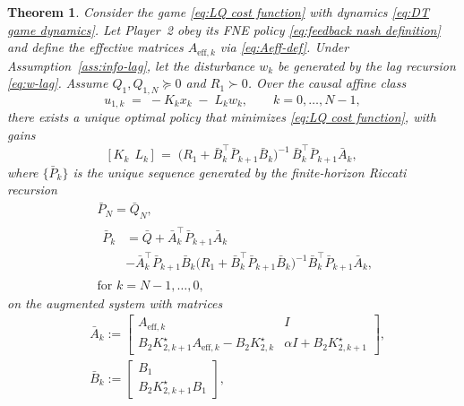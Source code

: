 \documentclass[letterpaper, 10 pt, conference]{ieeeconf}  %
\newtheorem{theorem}{\textbf{Theorem}} %
\begin{document}
\begin{theorem}
\label{thm:lag-optimal}
Consider the game \eqref{eq:LQ cost function} with dynamics \eqref{eq:DT game dynamics}.
Let Player~2 obey its FNE policy \eqref{eq:feedback nash definition} and define the effective matrices
$A_{\mathrm{eff},k}$ via \eqref{eq:Aeff-def}. Under Assumption~\ref{ass:info-lag}, let the disturbance $w_k$ be generated by the lag recursion
\eqref{eq:w-lag}. Assume $Q_1,Q_{1,N}\succeq 0$ and $R_1\succ 0$. Over the causal affine class
\begin{equation}\label{eq:policy-class}
u_{1,k} \;=\; -K_k x_k \;-\; L_k w_k , \qquad k=0,\dots,N-1,
\end{equation}
there exists a \emph{unique} optimal policy that minimizes \eqref{eq:LQ cost function}, with gains
\begin{equation}\label{eq:gains-closed}
\big[\,K_k\ \ L_k\,\big]
\;=\;
\big(R_1+\bar B_k^\top \bar P_{k+1}\bar B_k\big)^{-1}\,\bar B_k^\top \bar P_{k+1}\bar A_k,
\end{equation}
where $\{\bar P_k\}$ is the unique sequence generated by the finite-horizon Riccati recursion
\begin{equation}\label{eq:riccati-aug}
\begin{aligned}
&\bar P_N=\bar Q_N,\\
&\begin{aligned}
\bar P_k&=\bar Q+\bar A_k^\top \bar P_{k+1}\bar A_k\\
&-\bar A_k^\top \bar P_{k+1}\bar B_k\big(R_1+\bar B_k^\top \bar P_{k+1}\bar B_k\big)^{-1}\bar B_k^\top \bar P_{k+1}\bar A_k,
\end{aligned}\\
&\text{for } k=N-1,\dots,0,
\end{aligned}
\end{equation}
on the augmented system with matrices
\begin{equation}\label{eq:ABQ-def}
\begin{aligned}
&\bar A_k:=\begin{bmatrix}
A_{\mathrm{eff},k} & I\\[2pt]
B_2K^{\star}_{2,k+1}A_{\mathrm{eff},k}-B_2K^{\star}_{2,k} & \alpha I + B_2K^{\star}_{2,k+1}
\end{bmatrix},\\
&\bar B_k:=\begin{bmatrix}B_1\\[2pt] B_2K^{\star}_{2,k+1}B_1\end{bmatrix},
\end{aligned}

\end{equation}
\end{theorem}
\end{document}
